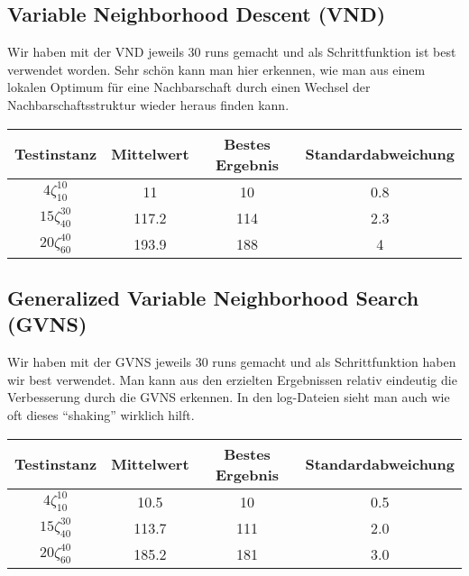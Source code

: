 \documentclass[a4paper,10pt]{article}
\begin{document}
\subsection{Variable Neighborhood Descent (VND)}
Wir haben mit der VND jeweils 30 runs gemacht und als Schrittfunktion ist best verwendet worden. Sehr sch\"{o}n kann man hier erkennen, wie man aus einem lokalen Optimum f\"{u}r eine Nachbarschaft durch einen Wechsel der Nachbarschaftsstruktur wieder heraus finden kann.
\bigskip

\begin{center}
\begin{tabular}{cccc}
\hline
Testinstanz & Mittelwert & Bestes Ergebnis & Standardabweichung \\
\hline
$4\zeta_{10}^{10}$ & 11 & 10 & 0.8 \\									
$15\zeta_{40}^{30}$ & 117.2 & 114 & 2.3 \\									
$20\zeta_{60}^{40}$ & 193.9 & 188 & 4 \\						
\hline
\end{tabular}
\end{center}

\subsection{Generalized Variable Neighborhood Search (GVNS)}

Wir haben mit der GVNS jeweils 30 runs gemacht und als Schrittfunktion haben wir best verwendet. Man kann aus den erzielten Ergebnissen relativ eindeutig die Verbesserung durch die GVNS erkennen. In den log-Dateien sieht man auch wie oft dieses "`shaking"' wirklich hilft.
\bigskip

\begin{center}
\begin{tabular}{cccc}
\hline
Testinstanz & Mittelwert & Bestes Ergebnis & Standardabweichung \\
\hline
$4\zeta_{10}^{10}$ & 10.5 & 10 & 0.5 \\									
$15\zeta_{40}^{30}$ & 113.7 & 111 & 2.0 \\									
$20\zeta_{60}^{40}$ & 185.2 & 181 & 3.0 \\						
\hline
\end{tabular}
\end{center}
\end{document}
